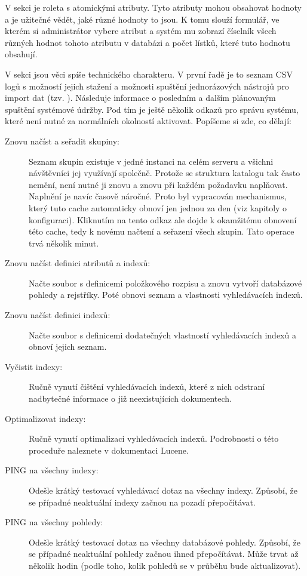 V sekci  je roleta s atomickými atributy. Tyto atributy mohou obsahovat hodnoty a je užitečné vědět, jaké různé hodnoty to jsou. K tomu slouží formulář, ve kterém si administrátor vybere atribut a systém mu zobrazí číselník všech různých hodnot tohoto atributu v databázi a počet lístků, které tuto hodnotu obsahují.

V sekci  jsou věci spíše technického charakteru. V první řadě je to seznam CSV logů s možností jejich stažení a možnosti spuštění jednorázových nástrojů pro import dat (tzv. ). Následuje informace o posledním a dalším plánovaným spuštění systémové údržby. Pod tím je ještě několik odkazů pro správu systému, které není nutné za normálních okolností aktivovat. Popíšeme si zde, co dělají:

\begin{description}
\item[Znovu načíst a seřadit skupiny:]{Seznam skupin existuje v jedné instanci na celém serveru a všichni návštěvníci jej využívají společně. Protože se struktura katalogu tak často nemění, není nutné ji znovu a znovu při každém požadavku naplňovat. Naplnění je navíc časově náročné. Proto byl vypracován mechanismus, který tuto cache automaticky obnoví jen jednou za den (viz kapitoly o konfiguraci). Kliknutím na tento odkaz ale dojde k okamžitému obnovení této cache, tedy k novému načtení a seřazení všech skupin. Tato operace trvá několik minut.}
\item[Znovu načíst definici atributů a indexů:]{Načte soubor s definicemi položkového rozpisu a znovu vytvoří databázové pohledy a rejstříky. Poté obnovi seznam a vlastnosti vyhledávacích indexů.}
\item[Znovu načíst definici indexů:]{Načte soubor s definicemi dodatečných vlastností vyhledávacích indexů a obnoví jejich seznam.}
\item[Vyčistit indexy:]{Ručně vynutí čištění vyhledávacích indexů, které z nich odstraní nadbytečné informace o již neexistujících dokumentech.}
\item[Optimalizovat indexy:]{Ručně vynutí optimalizaci vyhledávacích indexů. Podrobnosti o této proceduře naleznete v dokumentaci Lucene.}
\item[PING na všechny indexy:]{Odešle krátký testovací vyhledávací dotaz na všechny indexy. Způsobí, že se případné neaktuální indexy začnou na pozadí přepočítávat.}
\item[PING na všechny pohledy:]{Odešle krátký testovací dotaz na všechny databázové pohledy. Způsobí, že se případné neaktuální pohledy začnou ihned přepočítávat. Může trvat až několik hodin (podle toho, kolik pohledů se v průběhu bude aktualizovat).}
\end{description}

